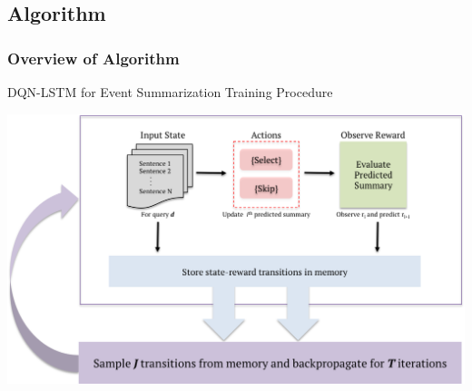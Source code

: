 \documentclass[]{beamer}
\begin{document}
\subsection{Algorithm}
	\begin{frame}
			\frametitle{Overview of Algorithm}
			DQN-LSTM for Event Summarization Training Procedure
			\begin{center}
			  \includegraphics[scale=0.45]{DQN_LSTM_Algorithm}
			\end{center}
	\end{frame}
\end{document}
